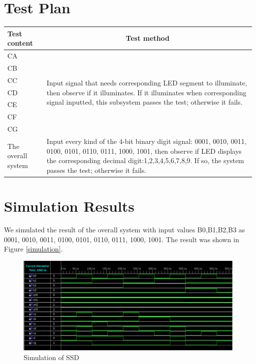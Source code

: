 \documentclass{article}
\begin{document}
\section{Test Plan}
\begin{center}
\begin{tabular}{|m{3cm}<{\centering}|m{10cm}|}
\hline
Test content & \multicolumn{1}{c|}{Test method} \\\hline
CA & \multirow{7}{10cm}{Input signal that needs corresponding LED segment to illuminate, then observe if it illuminates. If it illuminates when corresponding signal inputted, this subsystem passes the test; otherwise it fails.} \\\cline{1-1}
CB & \\\cline{1-1}
CC & \\\cline{1-1}
CD & \\\cline{1-1}
CE & \\\cline{1-1}
CF & \\\cline{1-1}
CG & \\\hline
The overall system & Input every kind of the 4-bit binary digit signal: 0001, 0010, 0011, 0100, 0101, 0110, 0111, 1000, 1001, then observe if LED displays the corresponding decimal digit:1,2,3,4,5,6,7,8,9. If so, the system passes the test; otherwise it fails. \\\hline
\end{tabular}
\end{center}

\section{Simulation Results}
We simulated the result of the overall system with input values B0,B1,B2,B3 as 0001, 0010, 0011, 0100, 0101, 0110, 0111, 1000, 1001. The result was shown in Figure \ref{simulation}.

\begin{figure}[!hbtp]
\centering
\includegraphics[width=0.9\linewidth]{simulation.png}
\caption{Simulation of SSD}
\label{design-ssd}
\end{figure}
\end{document}
